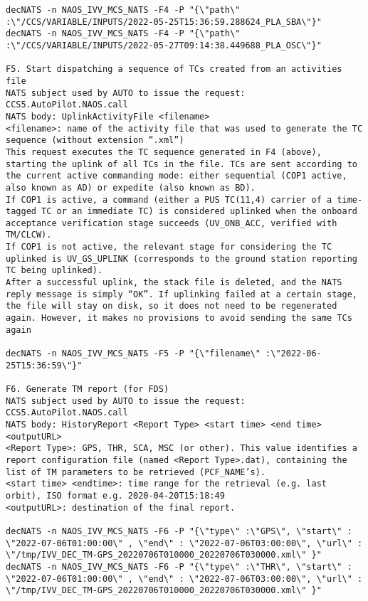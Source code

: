 \documentclass[dec_sum_main.tex]{subfiles}
\begin{document}
\begin{verbatim}
decNATS -n NAOS_IVV_MCS_NATS -F4 -P "{\"path\" :\"/CCS/VARIABLE/INPUTS/2022-05-25T15:36:59.288624_PLA_SBA\"}"
decNATS -n NAOS_IVV_MCS_NATS -F4 -P "{\"path\" :\"/CCS/VARIABLE/INPUTS/2022-05-27T09:14:38.449688_PLA_OSC\"}"

F5. Start dispatching a sequence of TCs created from an activities file
NATS subject used by AUTO to issue the request: CCS5.AutoPilot.NAOS.call
NATS body: UplinkActivityFile <filename>
<filename>: name of the activity file that was used to generate the TC sequence (without extension “.xml”)
This request executes the TC sequence generated in F4 (above), starting the uplink of all TCs in the file. TCs are sent according to the current active commanding mode: either sequential (COP1 active, also known as AD) or expedite (also known as BD).
If COP1 is active, a command (either a PUS TC(11,4) carrier of a time-tagged TC or an immediate TC) is considered uplinked when the onboard acceptance verification stage succeeds (UV_ONB_ACC, verified with TM/CLCW).
If COP1 is not active, the relevant stage for considering the TC uplinked is UV_GS_UPLINK (corresponds to the ground station reporting TC being uplinked).
After a successful uplink, the stack file is deleted, and the NATS reply message is simply “OK”. If uplinking failed at a certain stage, the file will stay on disk, so it does not need to be regenerated again. However, it makes no provisions to avoid sending the same TCs again

decNATS -n NAOS_IVV_MCS_NATS -F5 -P "{\"filename\" :\"2022-06-25T15:36:59\"}"

F6. Generate TM report (for FDS)
NATS subject used by AUTO to issue the request: CCS5.AutoPilot.NAOS.call
NATS body: HistoryReport <Report Type> <start time> <end time> <outputURL>
<Report Type>: GPS, THR, SCA, MSC (or other). This value identifies a report configuration file (named <Report Type>.dat), containing the list of TM parameters to be retrieved (PCF_NAME’s).
<start time> <endtime>: time range for the retrieval (e.g. last orbit), ISO format e.g. 2020-04-20T15:18:49
<outputURL>: destination of the final report.

decNATS -n NAOS_IVV_MCS_NATS -F6 -P "{\"type\" :\"GPS\", \"start\" : \"2022-07-06T01:00:00\" , \"end\" : \"2022-07-06T03:00:00\", \"url\" : \"/tmp/IVV_DEC_TM-GPS_20220706T010000_20220706T030000.xml\" }"
decNATS -n NAOS_IVV_MCS_NATS -F6 -P "{\"type\" :\"THR\", \"start\" : \"2022-07-06T01:00:00\" , \"end\" : \"2022-07-06T03:00:00\", \"url\" : \"/tmp/IVV_DEC_TM-GPS_20220706T010000_20220706T030000.xml\" }"


\end{verbatim}
\end{document}
